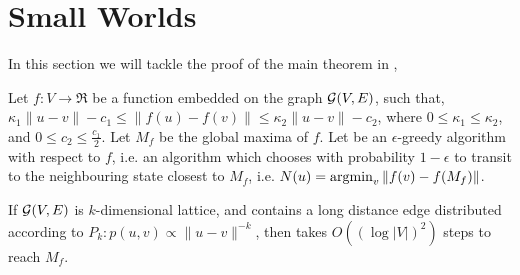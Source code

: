 \section{Small Worlds}
\label{sec:small-worlds}

In this section we will tackle the proof of the main theorem in
,

\begin{theorem}
  Let $f : V \to \Re$ be a function embedded on the graph $\mathcal{G}(V,E)$,
  such that, $\kappa_1 \|u-v\| - c_1 \le \|f(u) - f(v)\| \le \kappa_2
  \|u - v\| - c_2$, where $0 \le \kappa_1 \le \kappa_2$, and $0 \le c_2
  \le \frac{c_1}{2}$. Let $M_f$ be the global maxima of $f$. Let
  \egreedyalgo be an $\epsilon$-greedy algorithm with respect to $f$,
  i.e.  an algorithm which chooses with probability $1-\epsilon$ to
  transit to the neighbouring state closest to $M_f$, i.e. $N(u)
  = \operatorname{argmin}_v \|f(v) - f(M_f)\|$.
  
  If $\mathcal{G}(V,E)$ is $k$-dimensional lattice, and contains a long
  distance edge distributed according to $P_k: p(u,v) \propto
  \|u-v\|^{-k}$, then \egreedyalgo takes $O( (\log |V|)^2 )$ steps to
  reach $M_f$.
\end{theorem}
